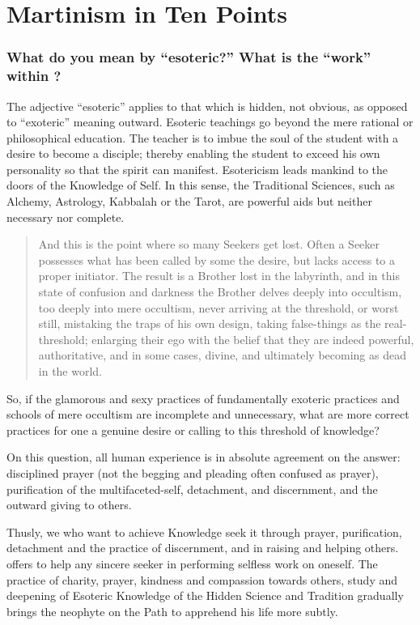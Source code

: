 \chapter{Martinism in Ten Points}

\subsection*{What do you mean by ``esoteric?'' What is the ``work'' within \moup{}?}

The adjective ``esoteric'' applies to that which is hidden, not obvious, as opposed to
``exoteric'' meaning outward. Esoteric teachings go beyond the mere rational or
philosophical education. The teacher is to imbue the soul of the student with a desire to
become a disciple; thereby enabling the student to exceed his own personality so that the
spirit can manifest. Esotericism leads mankind to the doors of the Knowledge of Self. In
this sense, the Traditional Sciences, such as Alchemy, Astrology, Kabbalah or the Tarot, are powerful aids but neither necessary nor complete.

\begin{quote}
And this is the point where so many Seekers get lost. Often a Seeker possesses what has
been called by some the desire, but lacks access to a proper initiator. The result is a Brother lost in the labyrinth, and in this state of confusion and darkness the Brother delves deeply
into occultism, too deeply into mere occultism, never arriving at the threshold, or worst
still, mistaking the traps of his own design, taking false-things as the real-threshold;
enlarging their ego with the belief that they are indeed powerful, authoritative, and in some
cases, divine, and ultimately becoming as dead in the world.
\end{quote}

So, if the glamorous and sexy practices of fundamentally exoteric practices and schools of
mere occultism are incomplete and unnecessary, what are more correct practices for one a
genuine desire or calling to this threshold of knowledge?

On this question, all human experience is in absolute agreement on the answer: disciplined
prayer (not the begging and pleading often confused as prayer), purification of the
multifaceted-self, detachment, and discernment, and the outward giving to others.

Thusly, we who want to achieve Knowledge seek it through prayer, purification,
detachment and the practice of discernment, and in raising and helping others. \moup{} offers to help any sincere seeker in performing 
selfless work on oneself. The practice of charity, prayer, kindness and compassion towards
others, study and deepening of Esoteric Knowledge of the Hidden Science and Tradition
gradually brings the neophyte on the Path to apprehend his life more subtly.

